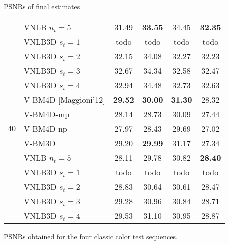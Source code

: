 \documentclass[mathserif, 8pt]{beamer}
\newcommand{\best}[1]{\textbf{\textcolor{MyOrange}{#1}}}
\begin{document}
\begin{frame}{PSNRs of final estimates}
\begin{center}
{\begin{tabular}{ c | l |c c c c}
			                      & VNLB $n_t = 5$       &       31.49  & \best{33.55} &       34.45  & \best{32.35} \\
			                      & VNLB3D $s_t = 1$     &       todo   &       todo   &       todo   &       todo   \\
			                      & VNLB3D $s_t = 2$     &       32.15  &       34.08  &       32.27  &       32.23  \\
			                      & VNLB3D $s_t = 3$     &       32.67  &       34.34  &       32.58  &       32.47  \\
			                      & VNLB3D $s_t = 4$     &       32.94  &       34.48  &       32.73  &       32.63  \\\hline
%
			\multirow{5}{*}{$40$} & V-BM4D [Maggioni'12] & \best{29.52} & \best{30.00} & \best{31.30} &       28.32  \\
			                      & V-BM4D-mp            &       28.14  &       28.73  &       30.09  &       27.44  \\
			                      & V-BM4D-np            &       27.97  &       28.43  &       29.69  &       27.02  \\
			                      & V-BM3D               &       29.20  & \best{29.99} &       31.17  &       27.34  \\
			                      & VNLB $n_t = 5$       &       28.11  &       29.78  &       30.82  & \best{28.40} \\
			                      & VNLB3D $s_t = 1$     &       todo   &       todo   &       todo   &       todo   \\
			                      & VNLB3D $s_t = 2$     &       28.83  &       30.64  &       30.61  &       28.47  \\
			                      & VNLB3D $s_t = 3$     &       29.28  &       30.96  &       30.84  &       28.71  \\
			                      & VNLB3D $s_t = 4$     &       29.53  &       31.10  &       30.95  &       28.87  \\\hline
		\end{tabular}}


		\bigskip

		PSNRs obtained for the four classic color test sequences.
	\end{center}
\end{frame}
\end{document}
